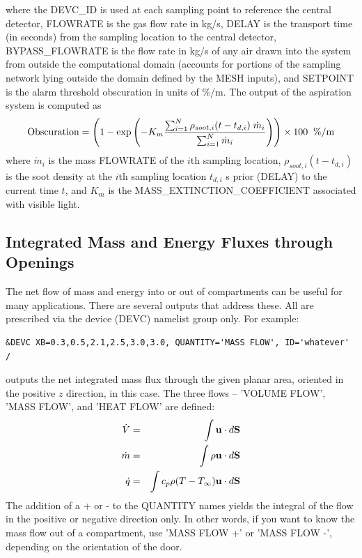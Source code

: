 \documentclass[11pt]{book}
\newcommand{\dS}{{d\bf S}}
\newcommand{\bu}{{\bf u}}
\newcommand{\dm}{\dot{m}}
\newcommand{\be}{\begin{equation}}
\newcommand{\ee}{\end{equation}}
\begin{document}
\noindent
where the {\ct DEVC\_ID} is used at each sampling point to reference the central detector, {\ct FLOWRATE} is the gas
flow rate in kg/s, {\ct DELAY} is the transport time (in seconds) from the sampling location to the central detector,
{\ct BYPASS\_FLOWRATE} is the flow rate in kg/s of any air drawn into the system from outside the computational
domain (accounts for portions of the sampling network lying outside the domain defined by the {\ct MESH}
inputs), and {\ct SETPOINT} is the alarm threshold obscuration in units of \%/m. The output of the aspiration system is
computed as
\be
  \hbox{Obscuration}  = \left(1 - \exp \left( -K_m \frac {\sum_{i=1}^N {\rho_{soot,i}( t-t_{d,i}) \; \dm_i}} {\sum_{i=1}^N{ \dm_i} } \right)  \right) \times 100  \; \; \hbox{\%/m}
\ee
where $\dm_i$ is the mass {\ct FLOWRATE} of the $i$th sampling location, $\rho_{soot,i}( t-t_{d,i})$ is the soot density at
the $i$th sampling location $t_{d,i}$ s prior ({\ct DELAY}) to the current time $t$, and $K_m$ is the {\ct MASS\_EXTINCTION\_COEFFICIENT} associated with visible light.


\subsection{Integrated Mass and Energy Fluxes through Openings}
\label{info:flows}

The net flow of mass and energy into or out of compartments can be useful for many applications. There are several outputs that address these. All are prescribed via
the device ({\ct DEVC}) namelist group only. For example:

\footnotesize
\begin{verbatim}
&DEVC XB=0.3,0.5,2.1,2.5,3.0,3.0, QUANTITY='MASS FLOW', ID='whatever' /
\end{verbatim}
\normalsize

\noindent
outputs the net integrated mass flux through the given planar area, oriented in the positive $z$ direction, in this case. The three flows -- {\ct 'VOLUME FLOW'}, {\ct 'MASS FLOW'},
and {\ct 'HEAT FLOW'} are defined:
\begin{eqnarray*} \dot{V} &=& \int \bu \cdot \dS  \\
                  \dot{m} &=& \int \rho \bu \cdot \dS \\
                  \dot{q} &=& \int c_p \rho (T-T_\infty) \bu \cdot \dS  \end{eqnarray*}
The addition of a {\ct +} or {\ct -} to the {\ct QUANTITY} names yields the integral of the flow in the positive or negative direction only. In other words, if you want to know
the mass flow out of a compartment, use {\ct 'MASS FLOW +'} or {\ct 'MASS FLOW -'}, depending on the orientation of the door.
\end{document}
